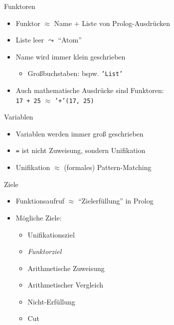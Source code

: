 \documentclass{beamer}
\begin{document}
\begin{frame}{Funktoren}

	\begin{itemize}
		\item Funktor $\approx$ Name + Liste von Prolog-Ausdrücken
		\item Liste leer $\leadsto$ \enquote{Atom}
		\item Name wird immer klein geschrieben
		\begin{itemize}
			\item Großbuchstaben: bspw. \texttt{'List'}
		\end{itemize}
                \item Auch mathematische Ausdrücke sind Funktoren:\\
                      \texttt{17 + 25} $\approx$ \texttt{'+'(17, 25)}
	\end{itemize}
\end{frame}

\begin{frame}{Variablen}

	\begin{itemize}
		\item Variablen werden immer groß geschrieben
		\item \texttt{=} ist nicht Zuweisung, sondern Unifikation
		\item Unifikation $\approx$ (formales) Pattern-Matching
	\end{itemize}
\end{frame}

\begin{frame}{Ziele}

	\begin{itemize}
		\item Funktionsaufruf $\approx$ \enquote{Zielerfüllung} in Prolog
		\item Mögliche Ziele:
		\begin{itemize}
			\item Unifikationsziel
                        \item \emph{Funktorziel}
			\item Arithmetische Zuweisung
			\item Arithmetischer Vergleich
			\item Nicht-Erfüllung
			\item Cut
		\end{itemize}
	\end{itemize}
\end{frame}
\end{document}
